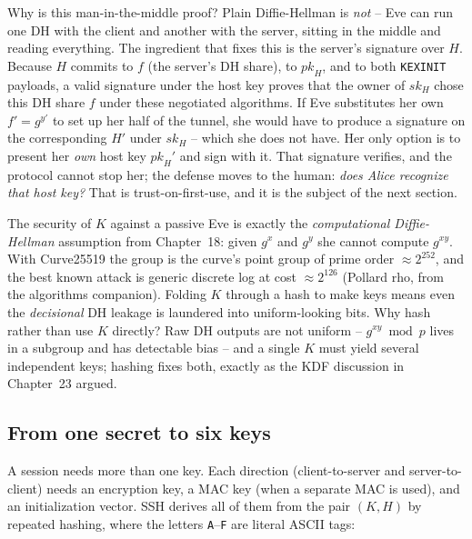 \begin{whybox}
Why is this man-in-the-middle proof? Plain Diffie-Hellman is \emph{not} -- Eve can run one DH with the client and another with the server, sitting in the middle and reading everything. The ingredient that fixes this is the server's signature over $H$. Because $H$ commits to $f$ (the server's DH share), to $\textit{pk}_H$, and to both \texttt{KEXINIT} payloads, a valid signature under the host key proves that the owner of $\textit{sk}_H$ chose this DH share $f$ under these negotiated algorithms. If Eve substitutes her own $f' = g^{y'}$ to set up her half of the tunnel, she would have to produce a signature on the corresponding $H'$ under $\textit{sk}_H$ -- which she does not have. Her only option is to present her \emph{own} host key $\textit{pk}_H'$ and sign with it. That signature verifies, and the protocol cannot stop her; the defense moves to the human: \emph{does Alice recognize that host key?} That is trust-on-first-use, and it is the subject of the next section.
\end{whybox}

\begin{connectionbox}
The security of $K$ against a passive Eve is exactly the \emph{computational Diffie-Hellman} assumption from Chapter~18: given $g^{x}$ and $g^{y}$ she cannot compute $g^{xy}$. With Curve25519 the group is the curve's point group of prime order $\approx 2^{252}$, and the best known attack is generic discrete log at cost $\approx 2^{126}$ (Pollard rho, from the algorithms companion). Folding $K$ through a hash to make keys means even the \emph{decisional} DH leakage is laundered into uniform-looking bits. Why hash rather than use $K$ directly? Raw DH outputs are not uniform -- $g^{xy} \bmod p$ lives in a subgroup and has detectable bias -- and a single $K$ must yield several independent keys; hashing fixes both, exactly as the KDF discussion in Chapter~23 argued.
\end{connectionbox}

\subsection{From one secret to six keys}

A session needs more than one key. Each direction (client-to-server and server-to-client) needs an encryption key, a MAC key (when a separate MAC is used), and an initialization vector. SSH derives all of them from the pair $(K, H)$ by repeated hashing, where the letters \texttt{A}--\texttt{F} are literal ASCII tags:

